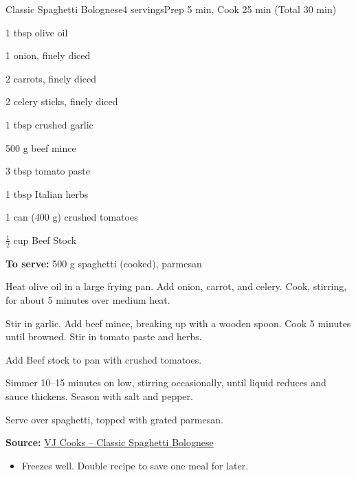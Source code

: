 \newpage
\begin{recipebox}{Classic Spaghetti Bolognese}{4 servings}{Prep 5 min, Cook 25 min (Total 30 min)}
\begin{ingredients}
  \item 1 tbsp olive oil
  \item 1 onion, finely diced
  \item 2 carrots, finely diced
  \item 2 celery sticks, finely diced
  \item 1 tbsp crushed garlic
  \item 500 g beef mince
  \item 3 tbsp tomato paste
  \item 1 tbsp Italian herbs
  \item 1 can (400 g) crushed tomatoes
  \item $\tfrac{1}{2}$ cup Beef Stock
  \item \textbf{To serve:} 500 g spaghetti (cooked), parmesan
\end{ingredients}

\begin{method}
  \item Heat olive oil in a large frying pan. Add onion, carrot, and celery. Cook, stirring, for about 5 minutes over medium heat.
  \item Stir in garlic. Add beef mince, breaking up with a wooden spoon. Cook 5 minutes until browned. Stir in tomato paste and herbs.
  \item Add Beef stock to pan with crushed tomatoes.
  \item Simmer 10--15 minutes on low, stirring occasionally, until liquid reduces and sauce thickens. Season with salt and pepper.
  \item Serve over spaghetti, topped with grated parmesan.
\end{method}

\textbf{Source:} \href{https://vjcooks.com/classic-spaghetti-bolognese/#mv-creation-346-jtr}{VJ Cooks – Classic Spaghetti Bolognese}

\begin{notes}
\begin{itemize}
  \item Freezes well. Double recipe to save one meal for later.
\end{itemize}
\end{notes}

\end{recipebox}

